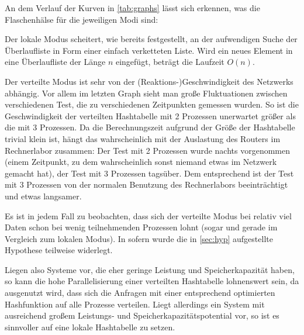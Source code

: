 \documentclass{scrreprt}
\begin{document}
An dem Verlauf der Kurven in \autoref{tab:graphs} lässt sich erkennen, was die Flaschenhälse für die jeweiligen Modi sind:\medskip

Der lokale Modus scheitert, wie bereits festgestellt, an der aufwendigen Suche der Überlaufliste in Form einer einfach verketteten Liste. Wird ein neues Element in eine Überlaufliste der Länge $n$ eingefügt, beträgt die Laufzeit $O(n)$.

Der verteilte Modus ist sehr von der (Reaktions-)Geschwindigkeit des Netzwerks abhängig. Vor allem im letzten Graph sieht man große Fluktuationen zwischen verschiedenen Test, die zu verschiedenen Zeitpunkten gemessen wurden. So ist die Geschwindigkeit der verteilten Hashtabelle mit 2 Prozessen unerwartet größer als die mit 3 Prozessen. Da die Berechnungszeit aufgrund der Größe der Hashtabelle trivial klein ist, hängt das wahrscheinlich mit der Auslastung des Routers im Rechnerlabor zusammen: Der Test mit 2 Prozessen wurde nachts vorgenommen (einem Zeitpunkt, zu dem wahrscheinlich sonst niemand etwas im Netzwerk gemacht hat), der Test mit 3 Prozessen tagsüber. Dem entsprechend ist der Test mit 3 Prozessen von der normalen Benutzung des Rechnerlabors beeinträchtigt und etwas langsamer. 
\bigskip

Es ist in jedem Fall zu beobachten, dass sich der verteilte Modus bei relativ viel Daten schon bei wenig teilnehmenden Prozessen lohnt (sogar und gerade im Vergleich zum lokalen Modus). In sofern wurde die in \autoref{sec:hyp} aufgestellte Hypothese teilweise widerlegt.\bigskip

Liegen also Systeme vor, die eher geringe Leistung und Speicherkapazität haben, so kann die hohe Parallelisierung einer verteilten Hashtabelle lohnenswert sein, da ausgenutzt wird, dass sich die Anfragen mit einer entsprechend optimierten Hashfunktion auf alle Prozesse verteilen. Liegt allerdings ein System mit ausreichend großem Leistungs- und Speicherkapazitätspotential vor, so ist es sinnvoller auf eine lokale Hashtabelle zu setzen.

\end{document}
